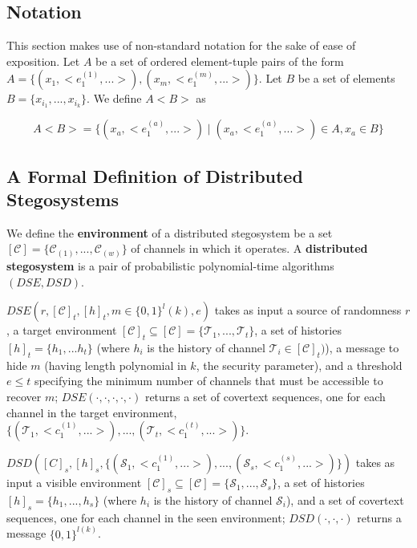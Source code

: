 \documentclass{article}
\begin{document}
\subsection{Notation}

This section makes use of non-standard notation for the sake of ease of exposition.  Let $A$ be a set of ordered element-tuple pairs of the form 
$A = \{ (x_1, <e_1^{(1)},...>), (x_m, <e_1^{(m)},...>)\}$.  Let $B$ be a set of elements $B=\{x_{i_1}, ..., x_{i_k}\}$.  We define $A<B>$ as 

\[ A<B> = \{(x_a,<e_1^{(a)},...>) \mid (x_a,<e_1^{(a)},...>) \in A, x_a \in B \} \]

\subsection{A Formal Definition of Distributed Stegosystems}

We define the \textbf{environment} of a distributed stegosystem be a set $[\mathcal{C}] = \{ \mathcal{C}_(1), ..., \mathcal{C}_(w) \}$ of channels 
in which it operates.
\newline\newline
A \textbf{distributed stegosystem} is a pair of probabilistic polynomial-time algorithms $(DSE,DSD)$.  

$DSE(r,[\mathcal{C}]_t, [h]_t, m \in \{0,1\}^l(k), e)$ takes 
as input a source of randomness $r$, a target environment $[\mathcal{C}]_t \subseteq [\mathcal{C}] = \{ \mathcal{T}_1,..., \mathcal{T}_t\}$, a 
set of histories $[h]_t = \{h_1,...h_t\}$ (where $h_i$ is the history of channel $\mathcal{T}_i \in [\mathcal{C}]_t)$), a message to hide $m$ 
(having length polynomial in $k$, the security parameter), and a threshold $e \leq t$ specifying the minimum number of channels that must be accessible to 
recover $m$;  $DSE(\cdot, \cdot, \cdot, \cdot, \cdot)$ returns a set of covertext sequences, one for each channel in the target environment,
$\{(\mathcal{T}_1, <c_1^{(1)},...>),...,(\mathcal{T}_t, <c_1^{(t)},...>)\}$.

$DSD([C]_s, [h]_s, \{(\mathcal{S}_1, <c_1^{(1)},...>),...,(\mathcal{S}_s, <c_1^{(s)},...>)\})$ takes as input a visible environment 
$[\mathcal{C}]_s \subseteq [\mathcal{C}] = \{ \mathcal{S}_1,..., \mathcal{S}_s\}$, a set of histories $[h]_s = \{h_1,...,h_s\}$ (where $h_i$ 
is the history of channel $\mathcal{S}_i$), and a set of covertext sequences, one for each channel in the seen environment; $DSD(\cdot, \cdot, \cdot)$ 
returns a message $\{0,1\}^{l(k)}$.
\end{document}

